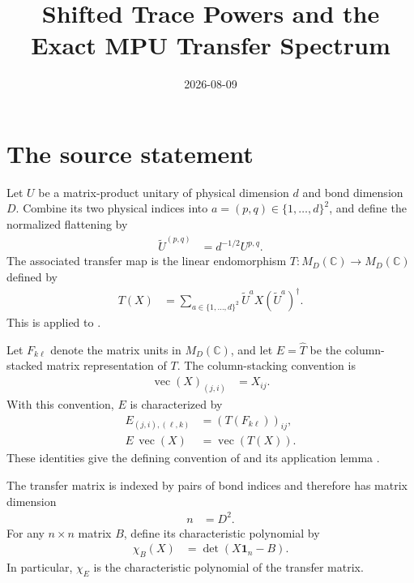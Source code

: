 \documentclass{article}
\title{Shifted Trace Powers and the Exact MPU Transfer Spectrum}
\author{}
\date{2026-08-09}
\begin{document}
\maketitle
{}

\section{The source statement}

Let $U$ be a matrix-product unitary of physical dimension $d$ and bond
dimension $D$. Combine its two physical indices into
$a=(p,q)\in\{1,\ldots,d\}^2$, and define the normalized flattening by
\begin{align}
    \widetilde U^{(p,q)}
        &= d^{-1/2}U^{p,q}.
    \label{eq:cpsv17_transfer_trace_power_normalized_flattening}
\end{align}
The associated transfer map is the linear endomorphism
$T:M_D(\mathbb C)\to M_D(\mathbb C)$ defined by
\begin{align}
    T(X)
        &= \sum_{a\in\{1,\ldots,d\}^2}
           \widetilde U^a X(\widetilde U^a)^\dagger.
    \label{eq:cpsv17_transfer_trace_power_transfer_map}
\end{align}
This is  applied to
.

Let $F_{k\ell}$ denote the matrix units in $M_D(\mathbb C)$, and let
$E=\widehat T$ be the column-stacked matrix representation of $T$. The
column-stacking convention is
\begin{align}
    \operatorname{vec}(X)_{(j,i)}
        &= X_{ij}.
    \label{eq:cpsv17_transfer_trace_power_column_stacking}
\end{align}
With this convention, $E$ is characterized by
\begin{align}
    E_{(j,i),(\ell,k)}
        &= (T(F_{k\ell}))_{ij},
    \label{eq:cpsv17_transfer_trace_power_transfer_matrix_entries}\\
    E\,\operatorname{vec}(X)
        &= \operatorname{vec}(T(X)).
    \label{eq:cpsv17_transfer_trace_power_transfer_matrix_action}
\end{align}
These identities give the defining convention of  and
its application lemma .

The transfer matrix is indexed by pairs of bond indices and therefore has
matrix dimension
\begin{align}
    n
        &= D^2.
    \label{eq:cpsv17_transfer_trace_power_transfer_dimension}
\end{align}
For any $n\times n$ matrix $B$, define its characteristic polynomial by
\begin{align}
    \chi_B(X)
        &= \det(X\mathbf 1_n-B).
    \label{eq:cpsv17_transfer_trace_power_characteristic_polynomial}
\end{align}
In particular, $\chi_E$ is the characteristic polynomial of the transfer
matrix.
\end{document}
